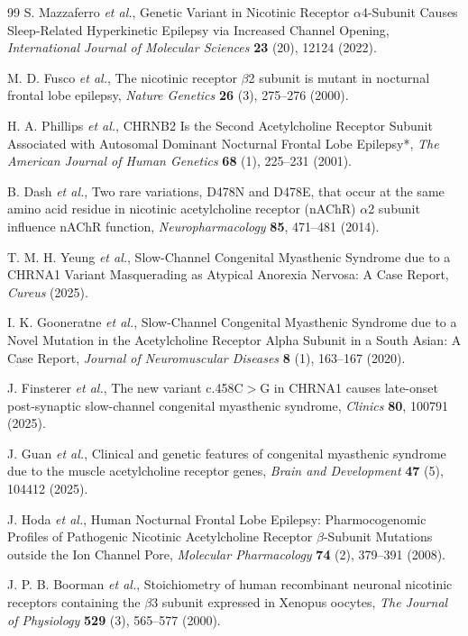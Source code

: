 \documentclass{ws-procs11x85}
\begin{document}
\begin{thebibliography}{99}
S. Mazzaferro {\em et al.}, Genetic Variant in Nicotinic Receptor $\alpha$4-Subunit Causes Sleep-Related Hyperkinetic Epilepsy via Increased Channel Opening, {\em International Journal of Molecular Sciences} {\bf 23} (20), 12124 (2022).

M. D. Fusco {\em et al.}, The nicotinic receptor $\beta$2 subunit is mutant in nocturnal frontal lobe epilepsy, {\em Nature Genetics} {\bf 26} (3), 275--276 (2000).

H. A. Phillips {\em et al.}, CHRNB2 Is the Second Acetylcholine Receptor Subunit Associated with Autosomal Dominant Nocturnal Frontal Lobe Epilepsy*, {\em The American Journal of Human Genetics} {\bf 68} (1), 225--231 (2001).

B. Dash {\em et al.}, Two rare variations, D478N and D478E, that occur at the same amino acid residue in nicotinic acetylcholine receptor (nAChR) $\alpha$2 subunit influence nAChR function, {\em Neuropharmacology} {\bf 85}, 471--481 (2014).

T. M. H. Yeung {\em et al.}, Slow-Channel Congenital Myasthenic Syndrome due to a CHRNA1 Variant Masquerading as Atypical Anorexia Nervosa: A Case Report, {\em Cureus} (2025).

I. K. Gooneratne {\em et al.}, Slow-Channel Congenital Myasthenic Syndrome due to a Novel Mutation in the Acetylcholine Receptor Alpha Subunit in a South Asian: A Case Report, {\em Journal of Neuromuscular Diseases} {\bf 8} (1), 163--167 (2020).

J. Finsterer {\em et al.}, The new variant c.458C$>$G in CHRNA1 causes late-onset post-synaptic slow-channel congenital myasthenic syndrome, {\em Clinics} {\bf 80}, 100791 (2025).

J. Guan {\em et al.}, Clinical and genetic features of congenital myasthenic syndrome due to the muscle acetylcholine receptor genes, {\em Brain and Development} {\bf 47} (5), 104412 (2025).

J. Hoda {\em et al.}, Human Nocturnal Frontal Lobe Epilepsy: Pharmocogenomic Profiles of Pathogenic Nicotinic Acetylcholine Receptor $\beta$-Subunit Mutations outside the Ion Channel Pore, {\em Molecular Pharmacology} {\bf 74} (2), 379--391 (2008).

J. P. B. Boorman {\em et al.}, Stoichiometry of human recombinant neuronal nicotinic receptors containing the $\beta$3 subunit expressed in Xenopus oocytes, {\em The Journal of Physiology} {\bf 529} (3), 565--577 (2000).


\end{thebibliography}
\end{document}
